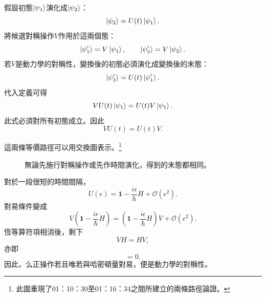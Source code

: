 假設初態\(\left\lvert\psi_1\right\rangle\)演化成\(\left\lvert\psi_2\right\rangle\)：
\begin{equation}
\left\lvert\psi_2\right\rangle=U(t)\left\lvert\psi_1\right\rangle.
\end{equation}
將候選對稱操作\(V\)作用於這兩個態：
\begin{equation}
\left\lvert\psi_1'\right\rangle=V\left\lvert\psi_1\right\rangle,
\qquad
\left\lvert\psi_2'\right\rangle=V\left\lvert\psi_2\right\rangle.
\end{equation}
若\(V\)是動力學的對稱性，變換後的初態必須演化成變換後的末態：
\begin{equation}
\left\lvert\psi_2'\right\rangle=U(t)\left\lvert\psi_1'\right\rangle.
\end{equation}
代入定義可得
\begin{equation}
VU(t)\left\lvert\psi_1\right\rangle
=
U(t)V\left\lvert\psi_1\right\rangle.
\end{equation}
此式必須對所有初態成立。因此
\begin{equation}
VU(t)=U(t)V.
\end{equation}

這兩條等價路徑可以用交換圖表示。\footnote{此圖重現了01：10：30至01：16：34之間所建立的兩條路徑論證。}
\begin{figure}
\centering
{}
\caption{無論先施行對稱操作或先作時間演化，得到的末態都相同。}
\end{figure}

\begin{classroomqa}
\end{classroomqa}

\begin{classroomqa}
\end{classroomqa}

對於一段很短的時間間隔，
\begin{equation}
U(\epsilon)
=
\mathbf 1-\frac{i\epsilon}{\hbar}H
+\mathcal O(\epsilon^2).
\end{equation}
對易條件變成
\begin{equation}
V\left(
\mathbf 1-\frac{i\epsilon}{\hbar}H
\right)
=
\left(
\mathbf 1-\frac{i\epsilon}{\hbar}H
\right)V
+\mathcal O(\epsilon^2).
\end{equation}
恆等算符項相消後，剩下
\begin{equation}
VH=HV,
\end{equation}
亦即
\begin{equation}
[V,H]=0.
\end{equation}
因此，么正操作若且唯若與哈密頓量對易，便是動力學的對稱性。


